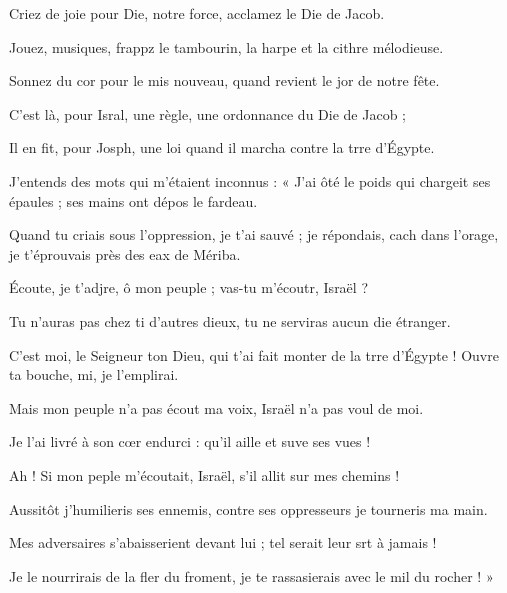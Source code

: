 \item Criez de joie pour Die, notre force,\psstar{} acclamez le Die de Jacob.
\item Jouez, musiques, frappz le tambourin,\psstar{} la harpe et la cithre mélodieuse.
\item Sonnez du cor pour le mis nouveau,\psstar{} quand revient le jor de notre fête.
\item C’est là, pour Isral, une règle,\psstar{} une ordonnance du Die de Jacob ;
\item Il en fit, pour Josph, une loi\psstar{} quand il marcha contre la trre d’Égypte.
\item J’entends des mots qui m’étaient inconnus :\pscross{} « J’ai ôté le poids qui chargeit ses épaules ;\psstar{} ses mains ont dépos le fardeau.
\item Quand tu criais sous l’oppression, je t’ai sauvé ;\pscross{} je répondais, cach dans l’orage,\psstar{} je t’éprouvais près des eax de Mériba.
\item Écoute, je t’adjre, ô mon peuple ;\psstar{} vas-tu m’écoutr, Israël ?
\item Tu n’auras pas chez ti d’autres dieux,\psstar{} tu ne serviras aucun die étranger.
\item C’est moi, le Seigneur ton Dieu,\pscross{} qui t’ai fait monter de la trre d’Égypte !\psstar{} Ouvre ta bouche, mi, je l’emplirai.
\item Mais mon peuple n’a pas écout ma voix,\psstar{} Israël n’a pas voul de moi.
\item Je l’ai livré à son cœr endurci :\psstar{} qu’il aille et suve ses vues !
\item Ah ! Si mon peple m’écoutait,\psstar{} Israël, s’il allit sur mes chemins !
\item Aussitôt j’humilieris ses ennemis,\psstar{} contre ses oppresseurs je tourneris ma main.
\item Mes adversaires s’abaisserient devant lui ;\psstar{} tel serait leur srt à jamais !
\item Je le nourrirais de la fler du froment,\psstar{} je te rassasierais avec le mil du rocher ! »